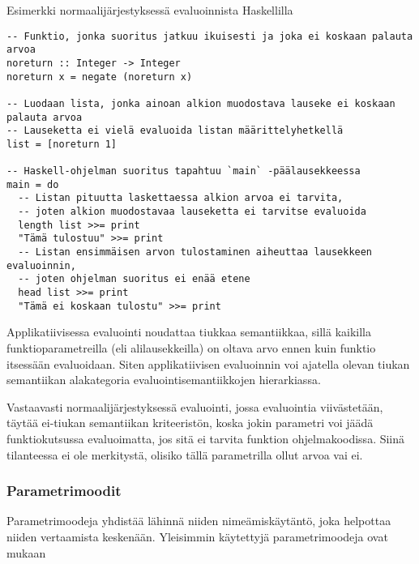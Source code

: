 \begin{listing}[H]
  \caption{Esimerkki normaalijärjestyksessä evaluoinnista Haskellilla}
  \label{codehaskellnormalorder}
  \bigskip
  \begin{verbatim}
-- Funktio, jonka suoritus jatkuu ikuisesti ja joka ei koskaan palauta arvoa
noreturn :: Integer -> Integer
noreturn x = negate (noreturn x)

-- Luodaan lista, jonka ainoan alkion muodostava lauseke ei koskaan palauta arvoa
-- Lauseketta ei vielä evaluoida listan määrittelyhetkellä
list = [noreturn 1]

-- Haskell-ohjelman suoritus tapahtuu `main` -päälausekkeessa
main = do
  -- Listan pituutta laskettaessa alkion arvoa ei tarvita,
  -- joten alkion muodostavaa lauseketta ei tarvitse evaluoida
  length list >>= print
  "Tämä tulostuu" >>= print
  -- Listan ensimmäisen arvon tulostaminen aiheuttaa lausekkeen evaluoinnin,
  -- joten ohjelman suoritus ei enää etene
  head list >>= print
  "Tämä ei koskaan tulostu" >>= print

  \end{verbatim}
\end{listing}

Applikatiivisessa evaluointi noudattaa tiukkaa semantiikkaa, sillä kaikilla funktioparametreilla (eli alilausekkeilla) on oltava arvo ennen kuin funktio itsessään evaluoidaan. Siten applikatiivisen evaluoinnin voi ajatella olevan tiukan semantiikan alakategoria evaluointisemantiikkojen hierarkiassa.

Vastaavasti normaalijärjestyksessä evaluointi, jossa evaluointia viivästetään, täytää ei-tiukan semantiikan kriteeristön, koska jokin parametri voi jäädä funktiokutsussa evaluoimatta, jos sitä ei tarvita funktion ohjelmakoodissa. Siinä tilanteessa ei ole merkitystä, olisiko tällä parametrilla ollut arvoa vai ei.


\subsubsection{Parametrimoodit}

Parametrimoodeja yhdistää lähinnä niiden nimeämiskäytäntö, joka helpottaa niiden vertaamista keskenään. Yleisimmin käytettyjä parametrimoodeja ovat \citet{scott2009programming} mukaan

